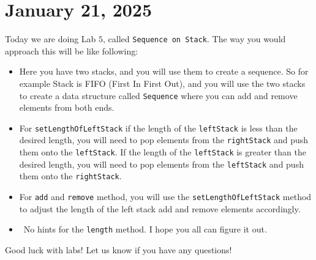 \documentclass[11pt]{article}
\begin{document}
\section{January 21, 2025}
Today we are doing Lab \(5\), called \texttt{Sequence on Stack}. The way you
would approach this will be like following:
\begin{itemize}
    \item Here you have two stacks, and you will use them to create a sequence. So for
          example Stack is FIFO (First In First Out), and you will use the two stacks to
          create a data structure called \texttt{Sequence} where you can add and remove
          elements from both ends.
    \item For \texttt{setLengthOfLeftStack} if the length of the \texttt{leftStack} is
          less than the desired length, you will need to pop elements from the
          \texttt{rightStack} and push them onto the \texttt{leftStack}. If the length of
          the \texttt{leftStack} is greater than the desired length, you will need to pop
          elements from the \texttt{leftStack} and push them onto the
          \texttt{rightStack}.

    \item For \texttt{add} and \texttt{remove} method, you will use the
          \texttt{setLengthOfLeftStack} method to adjust the length of the left stack add
          and remove elements accordingly.
    \item\ No hints for the \texttt{length} method. I hope you all can figure it out. 
\end{itemize}

Good luck with labs! Let us know if you have any questions!
\end{document}
